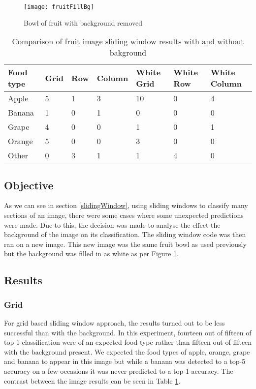 \begin{figure}
    \texttt{[image: fruitFillBg]}
    \caption{Bowl of fruit with background removed}
    \label{fig:filledFruit}
\end{figure}

\begin{table}[h]
    \centering
    \caption{Comparison of fruit image sliding window results with and without
    bakground}
    \label{comparisionFruitTable}
    \begin{tabular}{|l|l|l|l|l|l|l|}
    \hline
        \textbf{Food type} & \textbf{Grid} & \textbf{Row} & \textbf{Column} & \textbf{White Grid} & \textbf{White Row} & \textbf{White Column} \\ \hline
        Apple     & 5    & 1   & 3      & 10          & 0          & 4
        \\ \hline
        Banana    & 1    & 0   & 1      & 0           & 0          & 0
        \\ \hline
        Grape     & 4    & 0   & 0      & 1           & 0          & 1
        \\ \hline
        Orange    & 5    & 0   & 0      & 3           & 0          & 0
        \\ \hline
        Other     & 0    & 3   & 1      & 1           & 4          & 0  \\ \hline           
    \end{tabular}
\end{table}

\subsection*{Objective}
As we can see in section \ref{slidingWindow}, using sliding windows to classify many sections
of an image, there were some cases where some unexpected predictions were made.
Due to this, the decision was made to analyse the effect the background of the
image on its classification. The sliding window code was then ran on a new
image. This new image was the same fruit bowl as used previously but the
background was filled in as white as per Figure \ref{fig:filledFruit}.

\subsection*{Results}
\subsubsection*{Grid}
For grid based sliding window approach, the results turned out to be less
successful than with the background. In this experiment, fourteen out of fifteen
of top-1 classification were of an expected food type rather than fifteen out of
fifteen with the background present. We expected the food types of apple,
orange, grape and banana to appear in this image but while a banana was detected
to a top-5 accuracy on a few occasions it was never predicted to a top-1
accuracy. The contrast between the image results can be seen in Table
\ref{comparisionFruitTable}.

